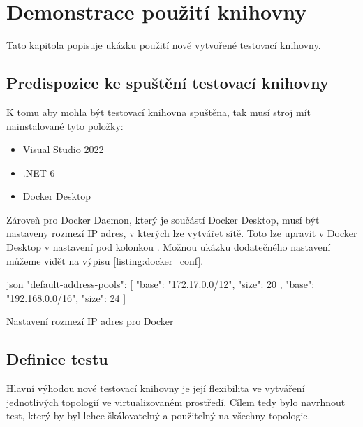 \chapter{Demonstrace použití knihovny}\label{chap:demonstration}

Tato kapitola popisuje ukázku použití nově vytvořené testovací knihovny.


\section{Predispozice ke spuštění testovací knihovny}\label{sec:test_requirements}

K tomu aby mohla být testovací knihovna spuštěna, tak musí stroj mít nainstalované tyto položky:

\begin{itemize}
    \item Visual Studio 2022
    \item .NET 6
    \item Docker Desktop
\end{itemize}

Zároveň pro Docker Daemon, který je součástí Docker Desktop, musí být nastaveny rozmezí IP adres, v kterých lze vytvářet sítě. Toto lze upravit v Docker Desktop v nastavení pod kolonkou . Možnou ukázku dodatečného nastavení můžeme vidět na výpisu \ref{listing:docker_conf}. 

\begin{listing}[htbp]
    \centering
    \begin{cminted}{json}
        "default-address-pools": [
            {
              "base": "172.17.0.0/12",
              "size": 20
            },
            {
              "base": "192.168.0.0/16",
              "size": 24
            }
          ]
    \end{cminted}
\caption{Nastavení rozmezí IP adres pro Docker}
\label{listing:docker_conf}
\end{listing}


\section{Definice testu}\label{sec:modbus_test}

Hlavní výhodou nové testovací knihovny je její flexibilita ve vytváření jednotlivých topologií ve virtualizovaném prostředí. Cílem tedy bylo navrhnout test, který by byl lehce škálovatelný a použitelný na všechny topologie. 

